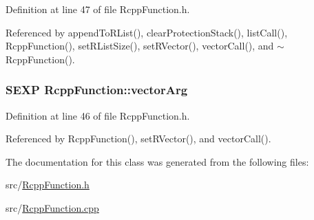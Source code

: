 Definition at line 47 of file RcppFunction.h.

Referenced by appendToRList(), clearProtectionStack(), listCall(), RcppFunction(), setRListSize(), setRVector(), vectorCall(), and $\sim$RcppFunction().\hypertarget{classRcppFunction_a0492c128c0f72cda44e679265b36b50e}{
\subsubsection[{vectorArg}]{\setlength{\rightskip}{0pt plus 5cm}SEXP {\bf RcppFunction::vectorArg}}}
\label{classRcppFunction_a0492c128c0f72cda44e679265b36b50e}


Definition at line 46 of file RcppFunction.h.

Referenced by RcppFunction(), setRVector(), and vectorCall().

The documentation for this class was generated from the following files:\begin{DoxyCompactItemize}
\item 
src/\hyperlink{RcppFunction_8h}{RcppFunction.h}\item 
src/\hyperlink{RcppFunction_8cpp}{RcppFunction.cpp}\end{DoxyCompactItemize}
